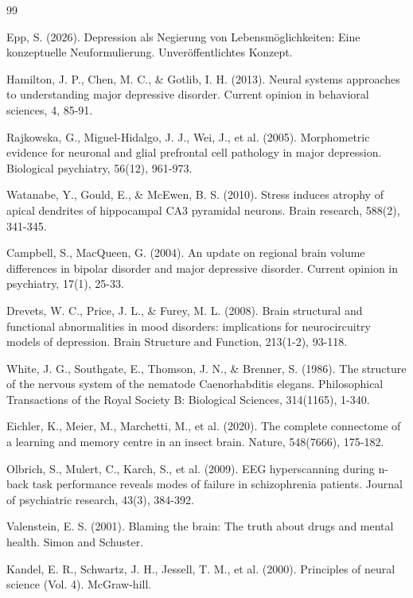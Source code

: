 \documentclass[a4paper,12pt]{article}
\theoremstyle{definition}
\begin{document}
\begin{thebibliography}{99}

 Epp, S. (2026). Depression als Negierung von Lebensmöglichkeiten: Eine konzeptuelle Neuformulierung. Unveröffentlichtes Konzept.

 Hamilton, J. P., Chen, M. C., \& Gotlib, I. H. (2013). Neural systems approaches to understanding major depressive disorder. Current opinion in behavioral sciences, 4, 85-91.

 Rajkowska, G., Miguel-Hidalgo, J. J., Wei, J., et al. (2005). Morphometric evidence for neuronal and glial prefrontal cell pathology in major depression. Biological psychiatry, 56(12), 961-973.

 Watanabe, Y., Gould, E., \& McEwen, B. S. (2010). Stress induces atrophy of apical dendrites of hippocampal CA3 pyramidal neurons. Brain research, 588(2), 341-345.

 Campbell, S., MacQueen, G. (2004). An update on regional brain volume differences in bipolar disorder and major depressive disorder. Current opinion in psychiatry, 17(1), 25-33.

 Drevets, W. C., Price, J. L., \& Furey, M. L. (2008). Brain structural and functional abnormalities in mood disorders: implications for neurocircuitry models of depression. Brain Structure and Function, 213(1-2), 93-118.

 White, J. G., Southgate, E., Thomson, J. N., \& Brenner, S. (1986). The structure of the nervous system of the nematode Caenorhabditis elegans. Philosophical Transactions of the Royal Society B: Biological Sciences, 314(1165), 1-340.

 Eichler, K., Meier, M., Marchetti, M., et al. (2020). The complete connectome of a learning and memory centre in an insect brain. Nature, 548(7666), 175-182.

 Olbrich, S., Mulert, C., Karch, S., et al. (2009). EEG hyperscanning during n-back task performance reveals modes of failure in schizophrenia patients. Journal of psychiatric research, 43(3), 384-392.

 Valenstein, E. S. (2001). Blaming the brain: The truth about drugs and mental health. Simon and Schuster.

 Kandel, E. R., Schwartz, J. H., Jessell, T. M., et al. (2000). Principles of neural science (Vol. 4). McGraw-hill.


\end{thebibliography}
\end{document}
